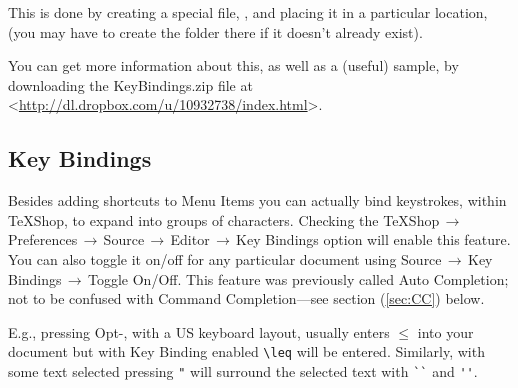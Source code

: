 \documentclass[letterpaper,11pt]{article}
\newcommand{\TS}{\textsf{\TeX Shop}}
\newcommand{\cmd}[1]{\textsf{#1}}
\newcommand{\mnu}[1]{\textsf{#1}}
\newcommand{\To}{\,\(\to\)\,}
\begin{document}
This is done by creating a special file, , and placing it in a particular location,  (you may have to create the  folder there if it doesn't already exist).

You can get more information about this, as well as a (useful) sample, by downloading the \textsf{KeyBindings.zip} file at <\url{http://dl.dropbox.com/u/10932738/index.html}>.


\subsection{Key Bindings}

Besides adding shortcuts to Menu Items you can actually bind keystrokes, within \TS, to expand into groups of characters. Checking the \mnu{TeXShop}\To\mnu{Preferences}\To\mnu{Source}\To\mnu{Editor}\To\mnu{Key Bindings} option will enable this feature. You can also toggle it on/off for any particular document using \mnu{Source}\To\mnu{Key Bindings}\To\mnu{Toggle On/Off}. This feature was previously called Auto Completion; not to be confused with Command Completion---see section (\ref{sec:CC}) below.

E.g., pressing \cmd{Opt-,} with a US keyboard layout, usually enters \texttt{\(\leq\)} into your document but with Key Binding enabled \verb|\leq| will be entered. Similarly, with some text selected pressing \verb|"| will surround the selected text with \verb|``| and \verb|''|.
\end{document}
